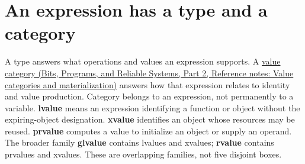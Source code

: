 \section{An expression has a type and a category}\label{05-engine-i-ch003-an-expression-has-a-type-and-a-category}

\hypertarget{05-engine-i-ch003-an-expression-has-a-type-and-a-category}{}

A type answers what operations and values an expression supports. A \href{../01-Bits-Programs-and-Reliable-Systems-P02/main.pdf\#nameddest=appendix-1121b30eaeb0}{value category (Bits, Programs, and Reliable Systems, Part 2, Reference notes: Value categories and materialization)} answers how that expression relates to identity and value production. Category belongs to an expression, not permanently to a variable. \textbf{lvalue} means an expression identifying a function or object without the expiring-object designation. \textbf{xvalue} identifies an object whose resources may be reused. \textbf{prvalue} computes a value to initialize an object or supply an operand. The broader family \textbf{glvalue} contains lvalues and xvalues; \textbf{rvalue} contains prvalues and xvalues. These are overlapping families, not five disjoint boxes.

